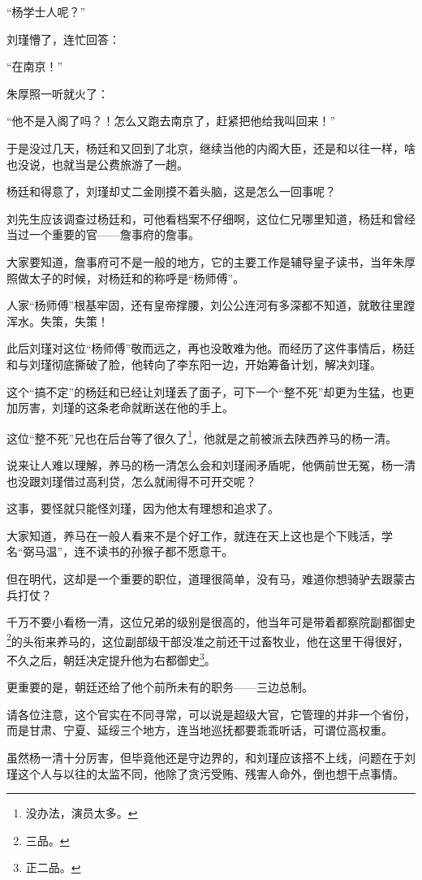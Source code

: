 \begin{multicols}{\theparacolNo}
“杨学士人呢？”

刘瑾懵了，连忙回答：

“在南京！”

朱厚照一听就火了：

“他不是入阁了吗？！怎么又跑去南京了，赶紧把他给我叫回来！”

于是没过几天，杨廷和又回到了北京，继续当他的内阁大臣，还是和以往一样，啥也没说，也就当是公费旅游了一趟。

杨廷和得意了，刘瑾却丈二金刚摸不着头脑，这是怎么一回事呢？

刘先生应该调查过杨廷和，可他看档案不仔细啊，这位仁兄哪里知道，杨廷和曾经当过一个重要的官——詹事府的詹事。

大家要知道，詹事府可不是一般的地方，它的主要工作是辅导皇子读书，当年朱厚照做太子的时候，对杨廷和的称呼是“杨师傅”。

人家“杨师傅”根基牢固，还有皇帝撑腰，刘公公连河有多深都不知道，就敢往里蹚浑水。失策，失策！

此后刘瑾对这位“杨师傅”敬而远之，再也没敢难为他。而经历了这件事情后，杨廷和与刘瑾彻底撕破了脸，他转向了李东阳一边，开始筹备计划，解决刘瑾。

这个“搞不定”的杨廷和已经让刘瑾丢了面子，可下一个“整不死”却更为生猛，也更加厉害，刘瑾的这条老命就断送在他的手上。

这位“整不死”兄也在后台等了很久了\footnote{没办法，演员太多。}，他就是之前被派去陕西养马的杨一清。

说来让人难以理解，养马的杨一清怎么会和刘瑾闹矛盾呢，他俩前世无冤，杨一清也没跟刘瑾借过高利贷，怎么就闹得不可开交呢？

这事，要怪就只能怪刘瑾，因为他太有理想和追求了。

大家知道，养马在一般人看来不是个好工作，就连在天上这也是个下贱活，学名“弼马温”，连不读书的孙猴子都不愿意干。

但在明代，这却是一个重要的职位，道理很简单，没有马，难道你想骑驴去跟蒙古兵打仗？

千万不要小看杨一清，这位兄弟的级别是很高的，他当年可是带着都察院副都御史\footnote{三品。}的头衔来养马的，这位副部级干部没准之前还干过畜牧业，他在这里干得很好，不久之后，朝廷决定提升他为右都御史\footnote{正二品。}。

更重要的是，朝廷还给了他个前所未有的职务——三边总制。

请各位注意，这个官实在不同寻常，可以说是超级大官，它管理的并非一个省份，而是甘肃、宁夏、延绥三个地方，连当地巡抚都要乖乖听话，可谓位高权重。

虽然杨一清十分厉害，但毕竟他还是守边界的，和刘瑾应该搭不上线，问题在于刘瑾这个人与以往的太监不同，他除了贪污受贿、残害人命外，倒也想干点事情。


\end{multicols}
